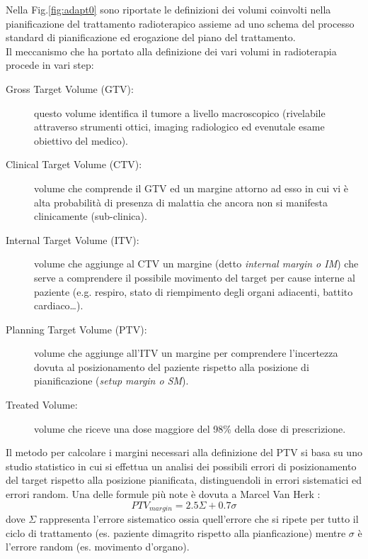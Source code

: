 Nella Fig.\ref{fig:adapt0} sono riportate le definizioni dei volumi coinvolti nella pianificazione del trattamento radioterapico assieme ad uno schema del processo standard di pianificazione ed erogazione del piano del trattamento.\\
Il meccanismo che ha portato alla definizione dei vari volumi in radioterapia procede in vari step:
\begin{description}
\item[Gross Target Volume (GTV):] questo volume identifica il tumore a livello macroscopico (rivelabile attraverso strumenti ottici, imaging radiologico ed evenutale esame obiettivo del medico).

\item[Clinical Target Volume (CTV):] volume che comprende il GTV ed un margine attorno ad esso in cui vi è alta probabilità di presenza di malattia che ancora non si manifesta clinicamente (sub-clinica).

\item[Internal Target Volume (ITV):] volume che aggiunge al CTV un margine (detto \textit{internal margin o IM}) che serve a comprendere il possibile movimento del target per cause interne al paziente (e.g. respiro, stato di riempimento degli organi adiacenti, battito cardiaco\ldots).

\item[Planning Target Volume (PTV):] volume che aggiunge all'ITV un margine per comprendere l'incertezza dovuta al posizionamento del paziente rispetto alla posizione di pianificazione (\textit{setup margin o SM}).

\item[Treated Volume:] volume che riceve una dose maggiore del 98\% della dose di prescrizione.

\end{description}

Il metodo per calcolare i margini necessari alla definizione del PTV si basa su uno studio statistico in cui si effettua un analisi dei possibili errori di posizionamento del target rispetto alla posizione pianificata, distinguendoli in errori sistematici ed errori random. Una delle formule più note è dovuta a Marcel Van Herk \cite{ICRU62}:
\begin{equation}
PTV_{margin} = 2.5\Sigma + 0.7\sigma
\end{equation}
dove $\Sigma$ rappresenta l'errore sistematico ossia quell'errore che si ripete per tutto il ciclo di trattamento (es. paziente dimagrito rispetto alla pianficazione) mentre $\sigma$ è l'errore random (es. movimento d'organo).

